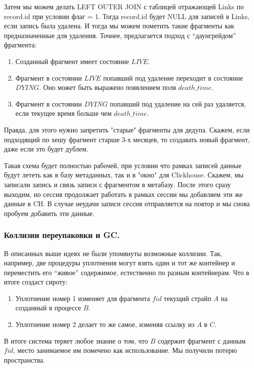 \documentclass[a4paper,12pt]{article}
\begin{document}
    \smallskip
    Затем мы можем делать LEFT OUTER JOIN с таблицей отражающей Links по record.id при условии флаг = 1. Тогда record.id будет NULL для записей в Links, если
    запись была удалена. И тогда мы можем пометить такие фрагменты как предназначенные для удаления. Точнее, предлагается подход с \enquote{даунгрейдом} фрагмента:

    \begin{enumerate}
        \item Созданный фрагмент имеет состояние $LIVE$.
        \item Фрагмент в состоянии $LIVE$ попавший под удаление переходит в состояние $DYING$. Оно может быть выражено появлением поля $death\_time$.
        \item Фрагмент в состоянии $DYING$ попавший под удаление на сей раз удаляется, если текущее время больше чем $death\_time$.
    \end{enumerate}

    \smallskip
    Правда, для этого нужно запретить "старые" фрагменты для дедупа. Скажем, если подходящий по хешу фрагмент старше 3-х месяцев, то создавать новый фрагмент, даже если это будет дублем.

    \bigskip
    Такая схема будет полностью рабочей, при условии что рамках записей данные будут лететь как в базу метаданных, так и в "окно" для Clickhouse.
    Скажем, мы записали запись и связь записи с фрагментом в метабазу. После этого сразу выходим, но сессия продолжает работать в рамках сессии
    мы добавляем эти же данные в CH. В случае неудачи записи сессия отправляется на повтор и мы снова пробуем добавить эти данные.

    \subsubsection{Коллизии переупаковки и GC.}

    В описанных выше идеях не были упомянуты возможные коллизии. Так, например, две процедуры уплотнения могут взять один и тот же контейнер и переместить его \enquote{живое}
    содержимое, естественно по разным контейнерам. Что в итоге создаст сироту:
    \begin{enumerate}
        \item Уплотнение номер 1 изменяет для фрагмента $fid$ текущий страйп $A$ на созданный в процессе $B$.
        \item Уплотнение номер 2 делает то же самое, изменяя ссылку из $A$ в $C$.
    \end{enumerate}
    В итоге система теряет любое знание о том, что $B$ содержит фрагмент с данным $fid$, место занимаемое им
    помечено как использование. Мы получили потерю пространства.
\end{document}
